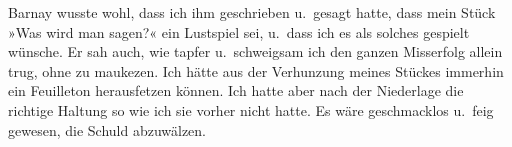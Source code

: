 \pstart
           Barnay wusste wohl, dass ich ihm geschrieben
          u. gesagt hatte, dass mein Stück »Was wird man
            sagen?« ein Lustspiel sei, u. dass ich es als solches gespielt wünsche. Er sah
          auch, wie tapfer u. schweigsam ich den ganzen Misserfolg allein trug, ohne zu maukezen.
          Ich hätte aus der Verhunzung meines Stückes immerhin ein Feuilleton herausfetzen können. Ich hatte aber nach der
          Niederlage die richtige Haltung {\pb} so wie ich sie vorher nicht hatte. Es wäre
          geschmacklos u. feig gewesen, die Schuld abzuwälzen.\pend
           
